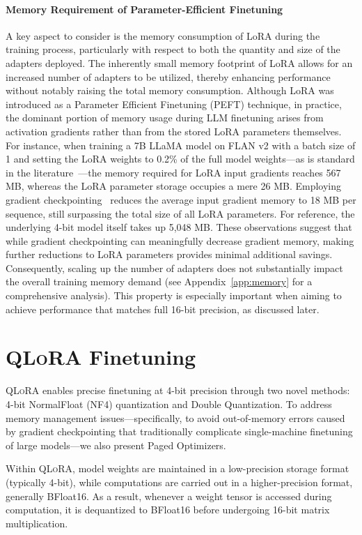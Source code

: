 \paragraph{Memory Requirement of Parameter-Efficient Finetuning} A key aspect to consider is the memory consumption of LoRA during the training process, particularly with respect to both the quantity and size of the adapters deployed. The inherently small memory footprint of LoRA allows for an increased number of adapters to be utilized, thereby enhancing performance without notably raising the total memory consumption. Although LoRA was introduced as a Parameter Efficient Finetuning (PEFT) technique, in practice, the dominant portion of memory usage during LLM finetuning arises from activation gradients rather than from the stored LoRA parameters themselves. For instance, when training a 7B LLaMA model on FLAN v2 with a batch size of 1 and setting the LoRA weights to 0.2\% of the full model weights—as is standard in the literature~\citep{hu2021lora,liu2022few}—the memory required for LoRA input gradients reaches 567 MB, whereas the LoRA parameter storage occupies a mere 26 MB. Employing gradient checkpointing~\citep{chen2016training} reduces the average input gradient memory to 18 MB per sequence, still surpassing the total size of all LoRA parameters. For reference, the underlying 4-bit model itself takes up 5,048 MB. These observations suggest that while gradient checkpointing can meaningfully decrease gradient memory, making further reductions to LoRA parameters provides minimal additional savings. Consequently, scaling up the number of adapters does not substantially impact the overall training memory demand (see Appendix~\ref{app:memory} for a comprehensive analysis). This property is especially important when aiming to achieve performance that matches full 16-bit precision, as discussed later.

\section{\textsc{QLoRA} Finetuning}

\textsc{QLoRA} enables precise finetuning at 4-bit precision through two novel methods: 4-bit NormalFloat (NF4) quantization and Double Quantization. To address memory management issues—specifically, to avoid out-of-memory errors caused by gradient checkpointing that traditionally complicate single-machine finetuning of large models—we also present Paged Optimizers.

Within \textsc{QLoRA}, model weights are maintained in a low-precision storage format (typically 4-bit), while computations are carried out in a higher-precision format, generally BFloat16. As a result, whenever a weight tensor is accessed during computation, it is dequantized to BFloat16 before undergoing 16-bit matrix multiplication.

